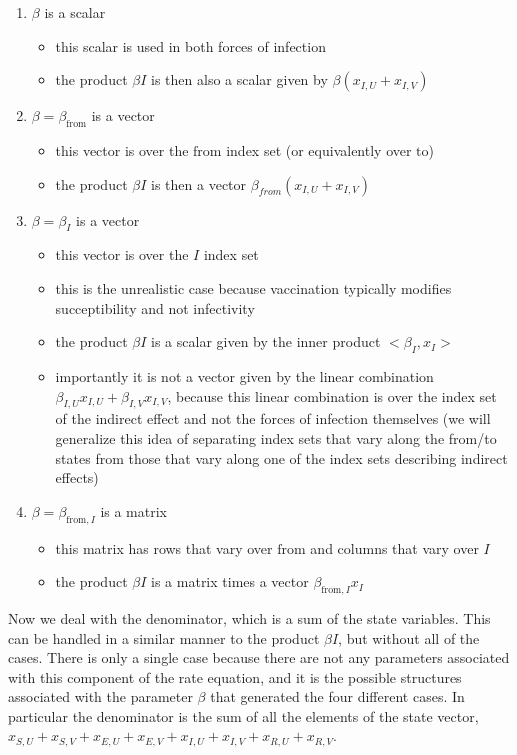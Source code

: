 \documentclass{article}
\theoremstyle{definition}
\begin{document}
\begin{enumerate}
    \item $\beta$ is a scalar
    \begin{itemize}
        \item this scalar is used in both forces of infection
        \item the product $\beta I$ is then also a scalar given by $\beta (x_{I,U} + x_{I,V})$
    \end{itemize}
    \item $\beta = \beta_\text{from}$ is a vector
    \begin{itemize}
        \item this vector is over the $\text{from}$ index set (or equivalently over $\text{to}$)
        \item the product $\beta I$ is then a vector $\beta_{from} (x_{I,U} + x_{I,V})$
    \end{itemize}
    \item $\beta = \beta_I$ is a vector
    \begin{itemize}
        \item this vector is over the $I$ index set
        \item this is the unrealistic case because vaccination typically modifies succeptibility and not infectivity
        \item the product $\beta I$ is a scalar given by the inner product $<\beta_I, x_I>$
        \item importantly it is not a vector given by the linear combination $\beta_{I,U} x_{I,U} + \beta_{I,V} x_{I,V}$, because this linear combination is over the index set of the indirect effect and not the forces of infection themselves (we will generalize this idea of separating index sets that vary along the from/to states from those that vary along one of the index sets describing indirect effects)
    \end{itemize}
    \item $\beta = \beta_{\text{from},I}$ is a matrix
    \begin{itemize}
        \item this matrix has rows that vary over $\text{from}$ and columns that vary over $I$
        \item the product $\beta I$ is a matrix times a vector $\beta_{\text{from}, I} x_I$
    \end{itemize}
\end{enumerate}


Now we deal with the denominator, which is a sum of the state variables. This can be handled in a similar manner to the product $\beta I$, but without all of the cases. There is only a single case because there are not any parameters associated with this component of the rate equation, and it is the possible structures associated with the parameter $\beta$ that generated the four different cases. In particular the denominator is the sum of all the elements of the state vector, $x_{S,U} + x_{S,V} + x_{E,U} + x_{E,V} + x_{I,U} + x_{I,V} + x_{R,U} + x_{R,V}$.
\end{document}

